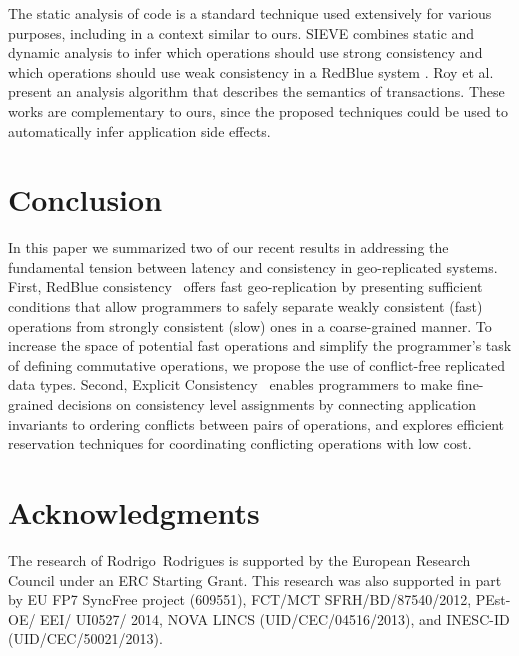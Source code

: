 \documentclass[11pt]{article}
\begin{document}
The static analysis of code is a standard technique used extensively for
various purposes,
including in a context similar to ours.
SIEVE \cite{Li14Automating} combines static and dynamic analysis to infer
which operations should use strong consistency and which operations should
use weak consistency in a RedBlue system \cite{Li2012RedBlue}.
Roy et al. \cite{Roy14Writes} present an analysis algorithm that
describes the semantics of transactions.
These works are complementary to ours, since the proposed techniques
could be used to automatically infer application side effects.

\section{Conclusion}
\label{sec:conc}

In this paper we summarized two of our recent results in addressing the fundamental tension
between latency and consistency in geo-replicated systems. First,
RedBlue consistency~\cite{Li2012RedBlue} offers fast geo-replication by
presenting sufficient conditions that allow programmers to safely separate
weakly consistent (fast) operations from strongly consistent (slow) ones in
a coarse-grained manner. To increase the space of potential fast operations
and simplify the programmer's task of defining commutative operations,
we propose the use of conflict-free replicated data types. Second,  Explicit Consistency~\cite{Balegas2015Indigo}
enables programmers to make fine-grained decisions on consistency level assignments
by connecting application invariants to ordering conflicts between pairs of operations,
and explores efficient reservation techniques for coordinating conflicting operations with
low cost.

\section*{Acknowledgments}

The research of Rodrigo\ Rodrigues is supported by the European Research Council under an ERC Starting Grant.
This research was also supported in part
    by EU FP7 SyncFree project (609551),
    FCT/MCT SFRH/BD/87540/2012, PEst-OE/ EEI/ UI0527/ 2014,
NOVA LINCS (UID/CEC/04516/2013), and INESC-ID (UID/CEC/50021/2013).
\end{document}
